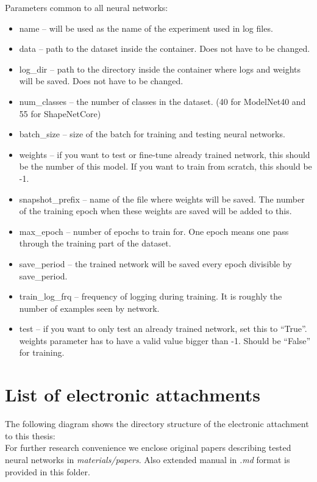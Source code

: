 Parameters common to all neural networks:
\begin{itemize}
	\item{name -- will be used as the name of the experiment used in log files.}
	\item{data -- path to the dataset inside the container. Does not have to be changed.}
	\item{log\_dir -- path to the directory inside the container where logs and weights will be saved. Does not have to be changed.}
	\item{num\_classes -- the number of classes in the dataset. (40 for ModelNet40 and 55 for ShapeNetCore)}
	\item{batch\_size -- size of the batch for training and testing neural networks.}
	\item{weights -- if you want to test or fine-tune already trained network, this should be the number of this model. If you want to train from scratch, this should be -1.}
	\item{snapshot\_prefix -- name of the file where weights will be saved. The number of the training epoch when these weights are saved will be added to this.}
	\item{max\_epoch -- number of epochs to train for. One epoch means one pass through the training part of the dataset.}
	\item{save\_period -- the trained network will be saved every epoch divisible by save\_period.}
	\item{train\_log\_frq -- frequency of logging during training. It is roughly the number of examples seen by network.}
	\item{test -- if you want to only test an already trained network, set this to ``True''. weights parameter has to have a valid value bigger than -1. Should be ``False'' for training.}
\end{itemize}

\chapter{List of electronic attachments}
\label{Attachment:electronic}
The following diagram shows the directory structure of the electronic attachment to this thesis: \\
\vspace{1cm}
For further research convenience we enclose original papers describing tested neural networks in \textit{materials/papers}. Also extended manual in \textit{.md} format is provided in this folder.


